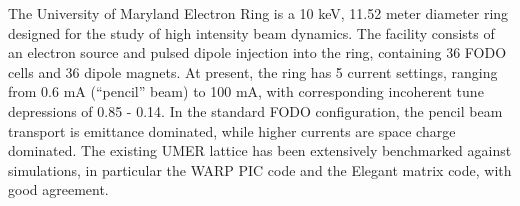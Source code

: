 The University of Maryland Electron Ring is a 10 keV, 11.52 meter diameter ring designed for the study of high intensity beam dynamics. The facility consists of an electron source and pulsed dipole injection into the ring, containing 36 FODO cells and 36 dipole magnets. At present, the ring has 5 current settings, ranging from 0.6 mA (“pencil” beam) to 100 mA, with corresponding incoherent tune depressions of 0.85 - 0.14. In the standard FODO configuration, the pencil beam transport is emittance dominated, while higher currents are space charge dominated. The existing UMER lattice has been extensively benchmarked against simulations, in particular the WARP PIC code and the Elegant matrix code, with good agreement.










